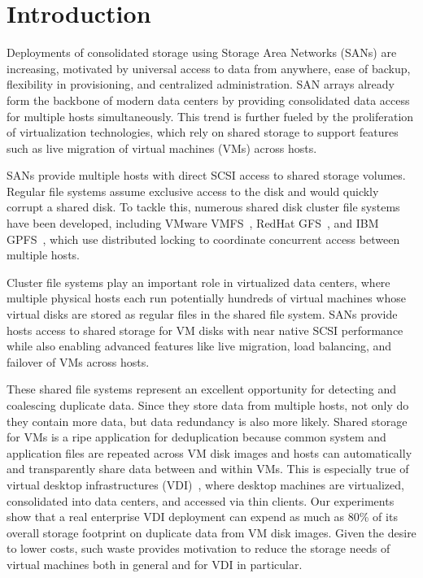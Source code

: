 
\section{Introduction}

Deployments of consolidated storage using Storage Area Networks (SANs)
are increasing, motivated by universal access to data from
anywhere, ease of backup, flexibility in provisioning, and centralized
administration.  SAN arrays already form the backbone of modern data
centers by providing consolidated data access for multiple hosts
simultaneously.  This trend is further fueled by the proliferation of
virtualization technologies, which rely on shared storage to support
features such as live migration of virtual machines (VMs) across hosts.

SANs provide multiple hosts with direct SCSI access to shared
storage volumes.  Regular file systems assume exclusive
access to the disk and would quickly
corrupt a shared disk.  To tackle this, numerous shared disk cluster
file systems have been developed, including VMware
VMFS~\cite{vmfsdatasheet}, RedHat GFS~\cite{preslan99gfs}, and IBM
GPFS~\cite{schmuck02gpfs}, which use distributed locking to coordinate
concurrent access
between multiple hosts.

Cluster file systems play an important role in virtualized data
centers, where multiple physical hosts each run potentially hundreds
of virtual machines whose virtual disks are stored as regular
files in the shared file system.  SANs provide hosts access to shared storage
for VM disks with near native SCSI performance while also enabling
advanced features like live migration, load balancing, and failover of
VMs across hosts.

These shared file systems represent an excellent opportunity for
detecting and coalescing duplicate data.  Since they store data from
multiple hosts, not only do they contain more data, but data
redundancy is also more likely.  Shared storage for VMs is a
ripe application for deduplication because common system
and application files are repeated across VM disk images and hosts can
automatically and transparently share data between and within VMs.
This is especially true of virtual desktop infrastructures
(VDI)~\cite{vdi-doc}, where desktop machines are virtualized,
consolidated into data centers, and accessed via thin clients.  Our
experiments show that a real enterprise VDI deployment can expend as much as
80\% of its overall storage footprint on duplicate data from VM disk
images. Given the desire to lower costs, such waste provides
motivation to reduce the storage needs of virtual machines both in
general and for VDI in particular.

